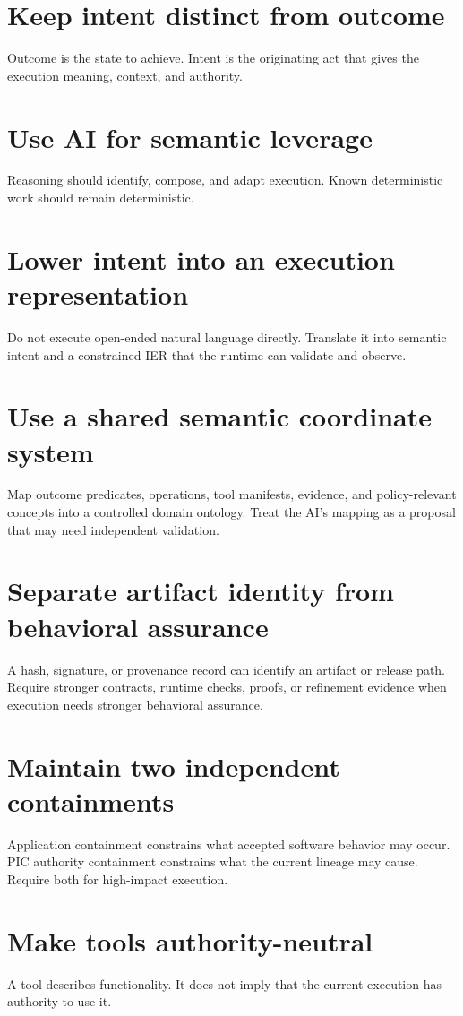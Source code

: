 \documentclass[10pt,oneside,openany]{book}
\begin{document}
\section{Keep intent distinct from outcome}
Outcome is the state to achieve. Intent is the originating act that gives the execution meaning, context, and authority.

\section{Use AI for semantic leverage}
Reasoning should identify, compose, and adapt execution. Known deterministic work should remain deterministic.

\section{Lower intent into an execution representation}
Do not execute open-ended natural language directly. Translate it into semantic intent and a constrained IER that the runtime can validate and observe.

\section{Use a shared semantic coordinate system}
Map outcome predicates, operations, tool manifests, evidence, and policy-relevant concepts into a controlled domain ontology. Treat the AI's mapping as a proposal that may need independent validation.

\section{Separate artifact identity from behavioral assurance}
A hash, signature, or provenance record can identify an artifact or release path. Require stronger contracts, runtime checks, proofs, or refinement evidence when execution needs stronger behavioral assurance.

\section{Maintain two independent containments}
Application containment constrains what accepted software behavior may occur. PIC authority containment constrains what the current lineage may cause. Require both for high-impact execution.

\section{Make tools authority-neutral}
A tool describes functionality. It does not imply that the current execution has authority to use it.
\end{document}
